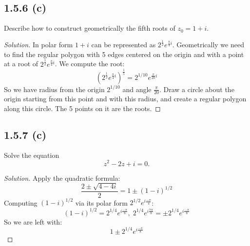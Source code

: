 \documentclass{article}
\newenvironment{solution}{
\begin{proof}[Solution]}{
\end{proof}}
\begin{document}
\subsection*{1.5.6 (c)}
Describe how to construct geometrically the fifth roots of $z_0 = 1 + i$.
\begin{solution}
  In polar form $1+i$ can be represented as $2^{\frac{1}{2}}e^{\frac{\pi}{4}i}$.
  Geometrically we need to find the regular polygon with 5 edges centered on the origin and with a point at a root of $2^{\frac{1}{2}}e^{\frac{\pi}{4}i}$.
  We compute the root:
  \[
    \left(2^{\frac{1}{2}} e^{\frac{\pi}{4}i} \right)^{\frac{1}{5}}
    = 2^{1/10} e^{\frac{\pi}{20}i}
  \]
  So we have radius from the origin $2^{1/10}$ and angle $\frac{\pi}{20}$. Draw a circle about the origin starting from this point and with this radius, and create a regular polygon along this circle. The 5 points on it are the roots.
\end{solution}

\subsection*{1.5.7 (c)}
Solve the equation
\[
  z^2 - 2z + i = 0.
\]
\begin{solution}
  Apply the quadratic formula:
  \[
    \frac{2 \pm \sqrt{4 - 4i}}{2} = 1 \pm (1 - i)^{1/2}
  \]
  Computing $(1-i)^{1/2}$ via its polar form $2^{1/2}e^{i \frac{-\pi}{4}}$:
  \[
    (1 - i)^{1/2}
    = 2^{1/4} e^{i \frac{-\pi}{8}},\; 2^{1/4} e^{i \frac{7\pi}{8}}
    = \pm 2^{1/4} e^{i \frac{-\pi}{8}}
  \]
  So we are left with:
  \[
    1 \pm 2^{1/4} e^{i \frac{-\pi}{8}}
  \]
\end{solution}
\end{document}
